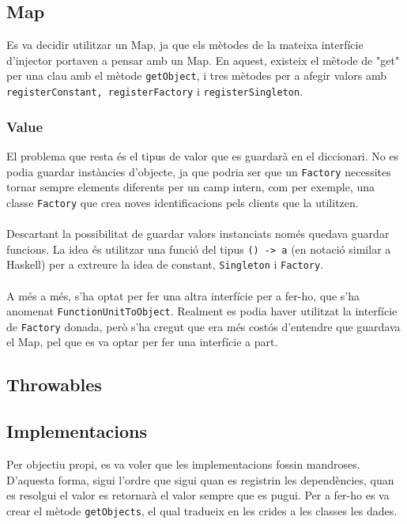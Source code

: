 
\subsection{Map}
Es va decidir utilitzar un Map, ja que els mètodes de la mateixa interfície d'injector portaven a pensar amb un Map. En aquest, existeix
el mètode de "get" per una clau amb el mètode \texttt{getObject}, i tres mètodes per a afegir valors 
amb \texttt{registerConstant, registerFactory} i \texttt{registerSingleton}. 
\subsubsection{Value}
El problema que resta és el tipus de valor que es guardarà en el diccionari. No es podia guardar instàncies d'objecte, ja que podria
ser que un \texttt{Factory} necessites tornar sempre elements diferents per un camp intern, com per exemple, una classe
\texttt{Factory} que crea noves identificacions pels clients que la utilitzen.\\
\\
Descartant la possibilitat de guardar valors instanciats només quedava guardar funcions. La idea és utilitzar una
funció del tipus \texttt{() -> a} (en notació similar a Haskell) per a extreure
la idea de constant, \texttt{Singleton} i \texttt{Factory}.\\
\\
A més a més, s'ha optat per fer una altra interfície per a fer-ho, que s'ha anomenat \texttt{FunctionUnitToObject}. Realment
es podia haver utilitzat la interfície de \texttt{Factory} donada, però s'ha cregut que era més costós d'entendre que 
guardava el Map, pel que es va optar per fer una interfície a part.
\subsection{Throwables}
\subsection{Implementacions}
Per objectiu propi, es va voler que les implementacions fossin mandroses. D'aquesta forma, sigui l'ordre que sigui quan
es registrin les dependències, quan es resolgui el valor es retornarà el valor sempre que es pugui. Per a fer-ho es va
crear el mètode \texttt{getObjects}, el qual tradueix en les crides a les classes les dades.
